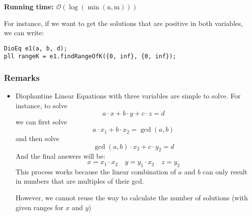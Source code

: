 \noindent \textbf{\boldmath Running time: $\mathcal{O}(\log(\mathrm{\min(n,m)}))$}

For instance, if we want to get the solutions that are positive
in both variables, we can write:
\begin{verbatim}
DioEq e1(a, b, d);
pll rangeK = e1.findRangeOfK({0, inf}, {0, inf});
\end{verbatim}

\subsubsection{Remarks}
\begin{itemize}
		\item Diophantine Linear Equations with three variables are
				simple to solve. For instance, to solve
				\[
						a\cdot x + b\cdot y + c\cdot z = d
				\]
				we can first solve 
				\[
						a \cdot x_1 + b\cdot x_2 = \gcd(a,b)
				\]
				and then solve 
				\[
						\gcd(a,b) \cdot x_2 + c \cdot y_2 = d
				\]
				And the final answers will be:
				\[
						x = x_1 \cdot x_2 \quad
						y = y_1 \cdot x_2 \quad
						z = y_2
				\]
				This process works because the linear combination of $a$ and 
				$b$ can only result in numbers that are multiples of their
				gcd. 

				However, we cannot reuse the way to calculate the number of
				solutions (with given ranges for $x$ and $y$)

\end{itemize}






